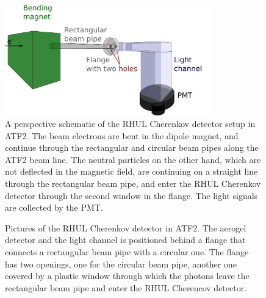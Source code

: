 \begin{figure}
\centering
\includegraphics[width=0.8\textwidth]{Figures/ATF/drawing_CherenkovSetup.png}
\caption[Schematic drawing of the RHUL Cherenkov detector setup]{A perspective schematic of the RHUL Cherenkov detector setup in ATF2.
The beam electrons are bent in the dipole magnet, and continue through the rectangular and circular beam pipes along the ATF2 beam line.
The neutral particles on the other hand, which are not deflected in the magnetic field, are continuing on a straight line through the rectangular beam pipe, and enter the RHUL Cherenkov detector through the second window in the flange. 
The light signals are collected by the PMT.}
\label{fig:RHUL_Cherenkov_Drawing}
\end{figure}

\begin{figure}
\begin{center}
\caption[Pictures of the RHUL Cherenkov detector]{Pictures of the RHUL Cherenkov detector in ATF2. 
The aerogel detector and the light channel is positioned behind a flange that connects a rectangular beam pipe with a circular one. 
The flange has two openings, one for the circular beam pipe, another one covered by a plastic window through which the photons leave the rectangular beam pipe and enter the RHUL Cherencov detector.}
\label{fig:RHUL_Cherenkov}
\end{center}
\end{figure}


